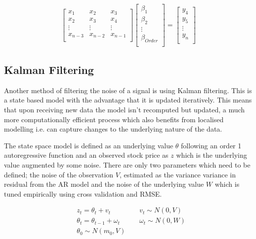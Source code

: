 \documentclass{sig-alternate-05-2015}
\begin{document}
\begin{align}
\begin{bmatrix}
  x_1 & x_2 & x_3 \\ 
  x_2 & x_3 & x_4 \\ 
  \vdots & \vdots & \vdots \\ 
  x_{n-3} & x_{n-2} & x_{n-1} \\
\end{bmatrix}
\begin{bmatrix}
  \beta_1 \\ 
  \beta_2 \\ 
  \vdots \\ 
  \beta_{Order} \\ 
\end{bmatrix}
=
\begin{bmatrix}
  y_4 \\ 
  y_5 \\ 
  \vdots \\ 
  y_n \\ 
\end{bmatrix}
\end{align}

\subsection{Kalman Filtering}
Another method of filtering the noise of a signal is using Kalman filtering. This is a state based model with the advantage that it is updated iteratively. This means that upon receiving new data the model isn't recomputed but updated, a much more computationally efficient process which also benefits from localised modelling i.e. can capture changes to the underlying nature of the data.  

The state space model is defined as an underlying value $\theta$ following an order 1 autoregressive function and an observed stock price as $z$ which is the underlying value augmented by some noise. There are only two parameters which need to be defined; the noise of the observation $V$, estimated as the variance variance in residual from the AR model and the noise of the underlying value $W$ which is tuned empirically using cross validation and RMSE. 

\begin{align}
&z_t = \theta_t + v_t \qquad &v_t \sim N(0, V) \\
&\theta_t = \theta_{t-1} + \omega_t \qquad &\omega_t \sim N(0, W) \\
&\theta_0 \sim N(m_0, V)
\end{align}
\end{document}
